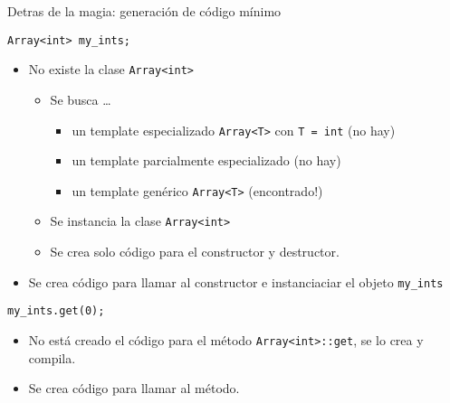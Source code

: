 \begin{frame}[fragile]{Detras de la magia: generaci\'on de c\'odigo m\'inimo}
   \begin{lstlisting}[style=normal]
Array<int> my_ints;
   \end{lstlisting}
   \begin{itemize}
      \item No existe la \alert{clase} \lstinline[style=normal]!Array<int>!
         \begin{itemize}
            \item Se busca \dots
            \begin{itemize}
               \item un template especializado \lstinline[style=normal]!Array<T>! con \lstinline[style=normal]!T = int! (no hay)
               \item un template parcialmente especializado (no hay)
               \item un template gen\'erico \lstinline[style=normal]!Array<T>! (encontrado!)
            \end{itemize}
            \item Se \alert{instancia} la clase \lstinline[style=normal]!Array<int>!
            \item Se crea solo c\'odigo para el constructor y destructor.
         \end{itemize}
      \item Se crea c\'odigo para llamar al constructor e instanciaciar el \alert{objeto} \lstinline[style=normal]!my_ints!
   \end{itemize}
   \pause
   \begin{lstlisting}[style=normal,firstnumber=2]
my_ints.get(0);
   \end{lstlisting}
   \begin{itemize}
      \item No est\'a creado el c\'odigo para el m\'etodo \lstinline[style=normal]!Array<int>::get!, se lo crea y compila.
      \item Se crea c\'odigo para llamar al m\'etodo.
   \end{itemize}
\end{frame}

